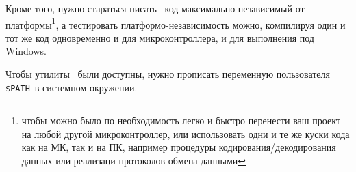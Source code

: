 Кроме того, нужно стараться писать \ код максимально
независимый от платформы\footnote{чтобы можно было по необходимость легко и
быстро перенести ваш проект на любой другой микроконтроллер, или использовать
одни и те же куски кода как на МК, так и на ПК, например процедуры
кодирования/декодирования данных или реализаци протоколов обмена данными}, а
тестировать платформо-независимость можно, компилируя один и тот же код
одновременно и для микроконтроллера, и для выполнения под Windows.

\bigskip
{}

\bigskip
{}



\label{winpath}

\bigskip Чтобы утилиты \ были доступны, нужно прописать
переменную пользователя \verb|$PATH|\ в системном окружении.

\bigskip{}

\bigskip{}

\bigskip{}



